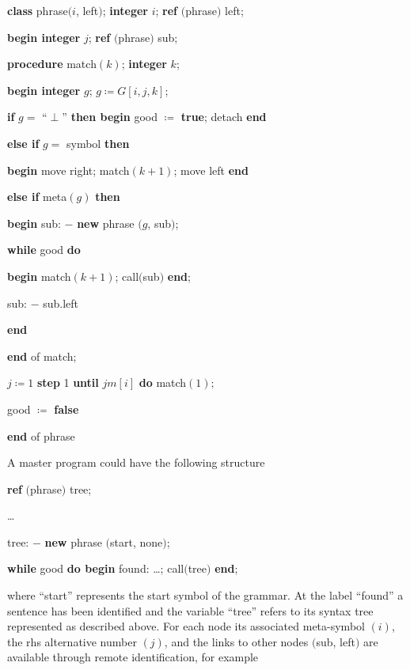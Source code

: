 \quad \textbf{class} phrase$(i$, left$)$; \textbf{integer} $i$; \textbf{ref} $($phrase$)$ left;

\quad \textbf{begin integer} $j$; \textbf{ref} $($phrase$)$ sub;

\quad \quad \textbf{procedure} match$(k)$; \textbf{integer} $k$;

\quad \quad \textbf{begin integer} $g$; $g\coloneq G[i,j, k]$;

\quad \quad \quad \textbf{if} $g =$ ``$\perp$'' \textbf{then begin} good $\coloneq$ \textbf{true}; detach \textbf{end}

\quad \quad \quad \textbf{else if} $g =$ symbol \textbf{then}

\quad \quad \quad \textbf{begin} move right; match$(k + 1)$; move left \textbf{end}

\quad \quad \quad \textbf{else if} meta$(g)$ \textbf{then}

\quad \quad \quad \textbf{begin} sub: $-$ \textbf{new} phrase $(g$, sub$)$;

\quad \quad \quad \quad \textbf{while} good \textbf{do}

\quad \quad \quad \quad \textbf{begin} match$(k + 1)$; call$($sub$)$ \textbf{end};

\quad \quad \quad \quad \quad sub: $-$ sub.left

\quad \quad \quad \quad \textbf{end}

\quad \quad \textbf{end} of match;

\quad \quad $j\coloneq 1$ \textbf{step} 1 \textbf{until} $jm[i]$ \textbf{do} match$(1);$

\quad \quad good $\coloneq$ \textbf{false}

\quad \textbf{end} of phrase

\noindent
A master program could have the following structure

\quad \textbf{ref} $($phrase$)$ tree;

\quad \dots

\quad tree: $-$ \textbf{new} phrase $($start, none$)$;

\quad \textbf{while} good \textbf{do begin} found: \dots; call$($tree$)$ \textbf{end};

\noindent
where ``start'' represents the start symbol of the grammar. At the label ``found'' a sentence has been identified and the variable ``tree'' refers to its syntax tree represented as described above. For each node its associated meta-symbol $(i)$, the rhs alternative number $(j)$, and the links to other nodes $($sub, left$)$ are available through remote identification, for example

